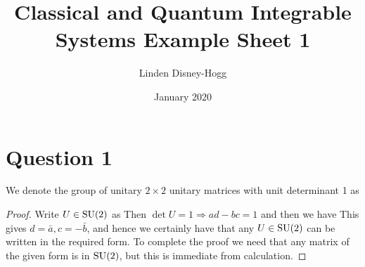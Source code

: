 \documentclass{article}
\title{Classical and Quantum Integrable Systems Example Sheet 1}
\author{Linden Disney-Hogg}
\date{January 2020}
\begin{document}
\maketitle
\tableofcontents

\section{Question 1}

\begin{definition}
We denote the group of unitary $2\times 2$ unitary matrices with unit determinant 1 as 
\end{definition}

\begin{prop}
\end{prop}
\begin{proof}
Write $U \in \operatorname{SU}(2)$ as 
Then $\det U = 1 \Rightarrow ad-bc = 1$ and then we have 
This gives $d = \bar{a}, c = -\bar{b}$, and hence we certainly have that any $U \in \operatorname{SU}(2)$ can be written in the required form. To complete the proof we need that any matrix of the given form is in $\operatorname{SU}(2)$, but this is immediate from calculation. 
\end{proof}

\end{document}
